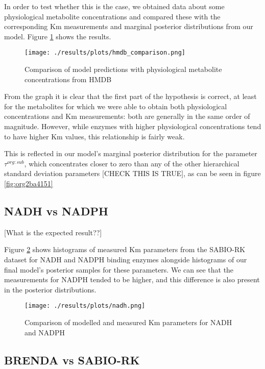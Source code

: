 \documentclass[11pt]{article}
\begin{document}
In order to test whether this is the case, we obtained data about some
physiological metabolite concentrations and compared these with the
corresponding Km measurements and marginal posterior distributions from our
model. Figure \ref{fig:org5701bf2} shows the results.

\begin{figure}[htbp]
\centering
\texttt{[image: ./results/plots/hmdb\_comparison.png]}
\caption{\label{fig:org5701bf2}Comparison of model predictions with physiological metabolite concentrations from HMDB}
\end{figure}

From the graph it is clear that the first part of the hypothesis is correct, at
least for the metabolites for which we were able to obtain both physiological
concentrations and Km measurements: both are generally in the same order of
magnitude. However, while enzymes with higher physiological concentrations tend
to have higher Km values, this relationship is fairly weak.

This is reflected in our model's marginal posterior distribution for the
parameter \(\tau^{org:sub}\), which concentrates closer to zero than any of the
other hierarchical standard deviation parameters [CHECK THIS IS TRUE], as can be
seen in figure \ref{fig:org2ba4151}

\subsection{NADH vs NADPH}
\label{sec:org92a3f6d}

[What is the expected result??]

Figure \ref{fig:org7b8e3d0} shows histograms of measured Km parameters from the SABIO-RK
dataset for NADH and NADPH binding enzymes alongside histograms of our final
model's posterior samples for these parameters. We can see that the measurements
for NADPH tended to be higher, and this difference is also present in the posterior
distributions.

\begin{figure}[htbp]
\centering
\texttt{[image: ./results/plots/nadh.png]}
\caption{\label{fig:org7b8e3d0}Comparison of modelled and measured Km parameters for NADH and NADPH}
\end{figure}

\subsection{BRENDA vs SABIO-RK}
\label{sec:orgcae16de}
\end{document}
